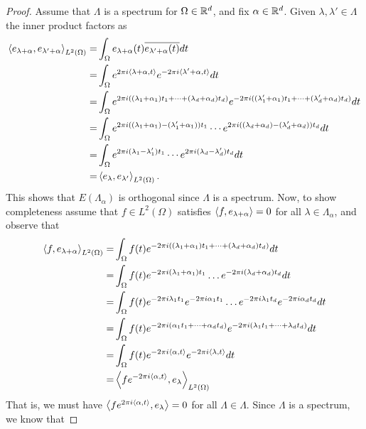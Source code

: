 \documentclass[../thesis.tex]{subfiles}
\begin{document}
\begin{proof}
    Assume that $\Lambda$ is a spectrum for $\Omega\in \mathbb{R}^d$, and fix $\alpha\in \mathbb{R}^d$. Given $\lambda,\lambda' \in \Lambda$ the inner product factors as
    \begin{align*}
        \left \langle e_{\lambda+\alpha},e_{\lambda'+\alpha} \right \rangle_{L^2(\Omega)} =& \int_{\Omega} e_{\lambda+\alpha}(t)\overline{e_{\lambda'+\alpha}(t)} dt\\
        =& \int_{\Omega} e^{2\pi i \langle\lambda+\alpha,t\rangle} e^{-2 \pi i \langle\lambda'+\alpha,t\rangle} dt\\
        =& \int_{\Omega} e^{2\pi i  ((\lambda_1+\alpha_1)t_1 + \dots +(\lambda_d+\alpha_d) t_d)} e^{-2\pi i  ((\lambda_1'+\alpha_1) t_1 + \dots +(\lambda_d'+\alpha_d) t_d)} dt\\
        =& \int_{\Omega} e^{2\pi i  ((\lambda_1+\alpha_1) -(\lambda_1'+\alpha_1))t_1} \cdots e^{2\pi i  ((\lambda_d+\alpha_d) -(\lambda_d'+\alpha_d))t_d} dt\\
        =& \int_{\Omega} e^{2\pi i  (\lambda_1 -\lambda_1')t_1} \cdots e^{2\pi i  (\lambda_d -\lambda_d')t_d} dt\\
        =& \left \langle e_{\lambda},e_{\lambda'} \right \rangle_{L^2(\Omega)}.
    \end{align*}
    This shows that $E(\Lambda_\alpha)$ is orthogonal since $\Lambda$ is a spectrum. Now, to show completeness assume that $f\in L^2(\Omega)$ satisfies $\left \langle f,e_{\lambda + \alpha} \right \rangle = 0$ for all $\lambda\in \Lambda_\alpha$, and observe that
    \begin{align*}
        \left \langle f,e_{\lambda+\alpha} \right \rangle_{L^2(\Omega)} =& \int_{\Omega} f(t) e^{-2\pi i  ((\lambda_1+\alpha_1) t_1 + \dots +(\lambda_d+\alpha_d) t_d)} dt\\
        =& \int_{\Omega} f(t) e^{-2\pi i  (\lambda_1+\alpha_1)t_1} \dots e^{-2\pi i  (\lambda_d+\alpha_d)t_d} dt\\
        =& \int_{\Omega} f(t) e^{-2\pi i  \lambda_1 t_1}e^{-2\pi i  \alpha_1 t_1} \dots e^{-2\pi i  \lambda_1 t_d}e^{-2\pi i  \alpha_d t_d} dt\\
        =& \int_{\Omega} f(t) e^{-2\pi i  (\alpha_1t_1 + \dots + \alpha_dt_d) }  e^{-2\pi i  (\lambda_1t_1 + \dots + \lambda_d t_d)}dt\\
        =& \int_{\Omega} f(t) e^{-2\pi i \langle\alpha, t\rangle }  e^{-2\pi i  \langle\lambda, t\rangle}dt\\
        =& \left \langle f e^{-2\pi i  \langle\alpha, t\rangle },e_{\lambda} \right \rangle_{L^2(\Omega)}
    \end{align*}
    That is, we must have $\left \langle f e^{2\pi i  \langle\alpha, t\rangle },e_{\lambda} \right \rangle = 0$ for all $\Lambda \in \Lambda$. Since $\Lambda$ is a spectrum, we know that 

\end{proof}
\end{document}
